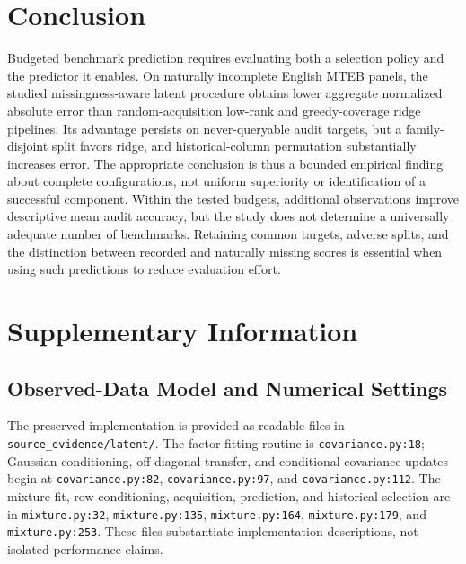 \documentclass{article}
\begin{document}
\section{Conclusion}
Budgeted benchmark prediction requires evaluating both a selection policy and the predictor it enables. On naturally incomplete English MTEB panels, the studied missingness-aware latent procedure obtains lower aggregate normalized absolute error than random-acquisition low-rank and greedy-coverage ridge pipelines. Its advantage persists on never-queryable audit targets, but a family-disjoint split favors ridge, and historical-column permutation substantially increases error. The appropriate conclusion is thus a bounded empirical finding about complete configurations, not uniform superiority or identification of a successful component. Within the tested budgets, additional observations improve descriptive mean audit accuracy, but the study does not determine a universally adequate number of benchmarks. Retaining common targets, adverse splits, and the distinction between recorded and naturally missing scores is essential when using such predictions to reduce evaluation effort.

\clearpage


\clearpage
\appendix
\section{Supplementary Information}

\subsection{Observed-Data Model and Numerical Settings}
The preserved implementation is provided as readable files in \texttt{source\_evidence/latent/}. The factor fitting routine is \texttt{covariance.py:18}; Gaussian conditioning, off-diagonal transfer, and conditional covariance updates begin at \texttt{covariance.py:82}, \texttt{covariance.py:97}, and \texttt{covariance.py:112}. The mixture fit, row conditioning, acquisition, prediction, and historical selection are in \texttt{mixture.py:32}, \texttt{mixture.py:135}, \texttt{mixture.py:164}, \texttt{mixture.py:179}, and \texttt{mixture.py:253}. These files substantiate implementation descriptions, not isolated performance claims.
\end{document}
